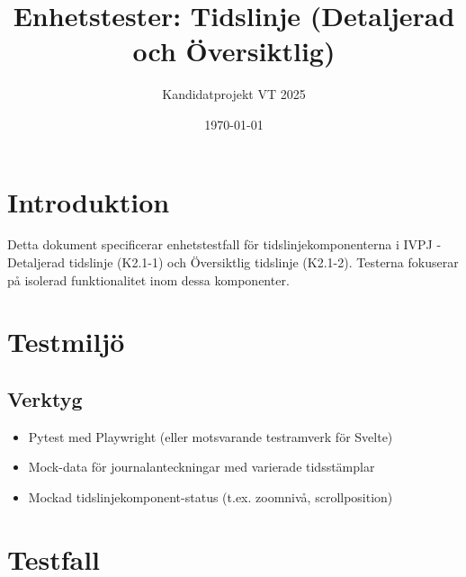 \documentclass{article}
\begin{document}
\title{Enhetstester: Tidslinje (Detaljerad och Översiktlig)}
\author{Kandidatprojekt VT 2025}
\date{\today}

\maketitle

\section{Introduktion}
Detta dokument specificerar enhetstestfall för tidslinjekomponenterna i IVPJ - Detaljerad tidslinje (K2.1-1) och Översiktlig tidslinje (K2.1-2). Testerna fokuserar på isolerad funktionalitet inom dessa komponenter.

\section{Testmiljö}
\subsection{Verktyg}
\begin{itemize}
    \item Pytest med Playwright (eller motsvarande testramverk för Svelte)
    \item Mock-data för journalanteckningar med varierade tidsstämplar
    \item Mockad tidslinjekomponent-status (t.ex. zoomnivå, scrollposition)
\end{itemize}

\section{Testfall}
\end{document}
